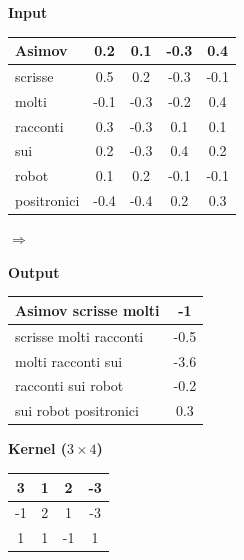 \documentclass[11pt,a4paper]{article}
\begin{document}
\begin{center}
\begin{minipage}{0.45\textwidth}
\centering
\textbf{Input} \\
\vspace{0.2cm}
\begin{tabular}{|l|c|c|c|c|}
\hline
Asimov & 0.2 & 0.1 & -0.3 & 0.4 \\ \hline
scrisse & 0.5 & 0.2 & -0.3 & -0.1 \\ \hline
molti & -0.1 & -0.3 & -0.2 & 0.4 \\ \hline
racconti & 0.3 & -0.3 & 0.1 & 0.1 \\ \hline
sui & 0.2 & -0.3 & 0.4 & 0.2 \\ \hline
robot & 0.1 & 0.2 & -0.1 & -0.1 \\ \hline
positronici & -0.4 & -0.4 & 0.2 & 0.3 \\ \hline
\end{tabular}
\end{minipage}%
\begin{minipage}{0.1\textwidth}
\centering
\Huge $\Rightarrow$
\end{minipage}%
\begin{minipage}{0.45\textwidth}
\centering
\textbf{Output} \\
\vspace{0.2cm}
\begin{tabular}{|l|c|}
\hline
Asimov scrisse molti & -1 \\ \hline
scrisse molti racconti & -0.5 \\ \hline
molti racconti sui & -3.6 \\ \hline
racconti sui robot & -0.2 \\ \hline
sui robot positronici & 0.3 \\ \hline
\end{tabular}
\end{minipage}

\vspace{0.8cm}

\textbf{Kernel ($3 \times 4$)} \\
\vspace{0.2cm}
\begin{tabular}{|c|c|c|c|}
\hline
3 & 1 & 2 & -3 \\ \hline
-1 & 2 & 1 & -3 \\ \hline
1 & 1 & -1 & 1 \\ \hline
\end{tabular}
\end{center}
\end{document}
